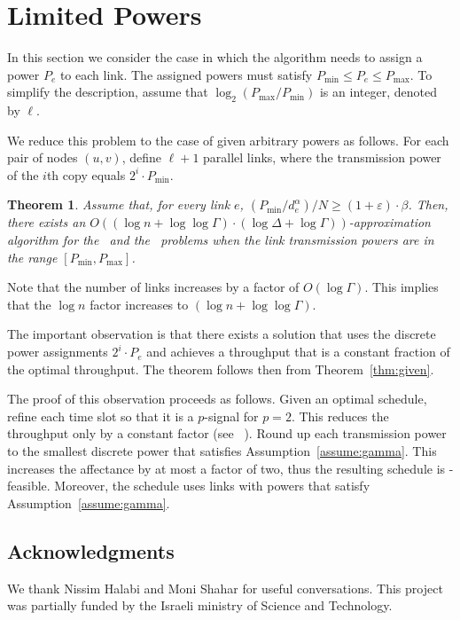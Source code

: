 \documentclass[11pt]{article}
\newenvironment{proof sketch}{\noindent {\bf Proof sketch:} }{\hfill \qed}
\newtheorem{theorem}{Theorem}
\newcommand{\eps}{\varepsilon}
\newcommand{\sinr}{\text{\sc{sinr}}}
\newcommand{\MAXMIN}{\text{\sc{Max-Min Throughput}}}
\newcommand{\MAX}{\text{\sc{Max Throughput}}}
\newcommand{\pmin}{P_{\min}}
\newcommand{\pmax}{P_{\max}}
\begin{document}
\section{Limited Powers}\label{sec:selected}\label{sec:limited}
In this section we consider the case in which the algorithm needs to
assign a power $P_e$ to each link. The assigned powers must satisfy
$\pmin \leq P_e \leq \pmax$. To simplify the description, assume that
$\log_2 (\pmax/\pmin)$ is an integer, denoted by $\ell$.

We reduce this problem to the case of given arbitrary powers as
follows.  For each pair of nodes $(u,v)$, define $\ell+1$ parallel links,
where the transmission power of the $i$th copy equals $2^i \cdot
\pmin$.
\begin{theorem}
  Assume that, for every link $e$, $(\pmin/d_e^\alpha)/N \geq
  (1+\eps)\cdot \beta$.  Then, there exists an $O((\log n+\log\log
  \Gamma) \cdot (\log \Delta + \log \Gamma ))$-approximation algorithm
  for the \MAX\ and the \MAXMIN\ problems when the link transmission
  powers are in the range $[\pmin,\pmax]$.
\end{theorem}
\begin{proof sketch}
  Note that the number of links increases by a factor of $O(\log
  \Gamma)$. This implies that the $\log n$ factor increases to $(\log
  n+\log\log \Gamma)$.

  The important observation is that there exists a solution that uses
  the discrete power assignments $2^i\cdot P_e$ and achieves a
  throughput that is a constant fraction of the optimal throughput.
  The theorem follows then from Theorem~\ref{thm:given}.

  The proof of this observation proceeds as follows. Given an optimal
  schedule, refine each time slot so that it is a $p$-signal for
  $p=2$.  This reduces the throughput only by a constant factor (see ~\cite[Thm 1]{HW}).
  Round up each transmission power to the smallest discrete power that satisfies Assumption~\ref{assume:gamma}.
  This increases the affectance by at most a factor of two,
  thus the resulting schedule is \sinr-feasible. Moreover, the
  schedule uses links with powers that satisfy Assumption~\ref{assume:gamma}.
\end{proof sketch}

\subsection*{Acknowledgments}
We thank Nissim Halabi and Moni Shahar for useful conversations.
This project was partially funded by the Israeli ministry of Science and Technology.
\end{document}
